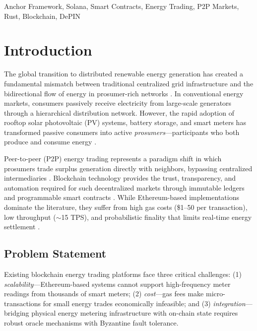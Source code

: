 \documentclass[conference]{IEEEtran}
\begin{document}
\begin{IEEEkeywords}
Anchor Framework, Solana, Smart Contracts, Energy Trading, P2P Markets, Rust, Blockchain, DePIN
\end{IEEEkeywords}

\section{Introduction}
\label{sec:introduction}

The global transition to distributed renewable energy generation has created a fundamental mismatch between traditional centralized grid infrastructure and the bidirectional flow of energy in prosumer-rich networks \cite{mengelkamp2018, tushar2020}. In conventional energy markets, consumers passively receive electricity from large-scale generators through a hierarchical distribution network. However, the rapid adoption of rooftop solar photovoltaic (PV) systems, battery storage, and smart meters has transformed passive consumers into active \textit{prosumers}---participants who both produce and consume energy \cite{parag2016, zhou2020}.

Peer-to-peer (P2P) energy trading represents a paradigm shift in which prosumers trade surplus generation directly with neighbors, bypassing centralized intermediaries \cite{sousa2019, zhang2018}. Blockchain technology provides the trust, transparency, and automation required for such decentralized markets through immutable ledgers and programmable smart contracts \cite{andoni2019}. While Ethereum-based implementations dominate the literature, they suffer from high gas costs (\$1--50 per transaction), low throughput ($\sim$15 TPS), and probabilistic finality that limits real-time energy settlement \cite{digiesi2023}.

\subsection{Problem Statement}

Existing blockchain energy trading platforms face three critical challenges: (1) \textit{scalability}---Ethereum-based systems cannot support high-frequency meter readings from thousands of smart meters; (2) \textit{cost}---gas fees make micro-transactions for small energy trades economically infeasible; and (3) \textit{integration}---bridging physical energy metering infrastructure with on-chain state requires robust oracle mechanisms with Byzantine fault tolerance.
\end{document}
